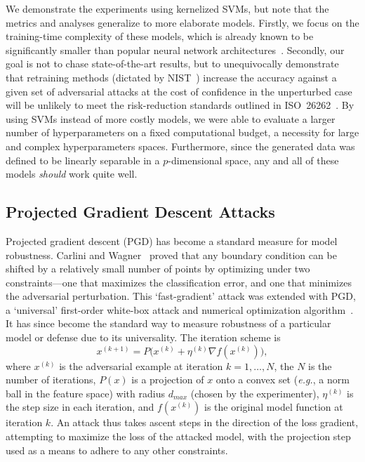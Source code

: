 \documentclass[fonts]{icst}
\begin{document}
We demonstrate the experiments using kernelized SVMs, but note that the metrics and analyses generalize to more elaborate models.
Firstly, we focus on the training-time complexity of these models, which is already known to be significantly smaller than popular neural network architectures~\cite{bienstock2018principled}.
Secondly, our goal is not to chase state-of-the-art results, but to unequivocally demonstrate that retraining methods (dictated by NIST~\cite{falco2006using}) increase the accuracy against a given set of adversarial attacks at the cost of confidence in the unperturbed case will be unlikely to meet the risk-reduction standards outlined in ISO~26262~\cite{iso26262}.
By using SVMs instead of more costly models, we were able to evaluate a larger number of hyperparameters on a fixed computational budget, a necessity for large and complex hyperparameters spaces.
Furthermore, since the generated data was defined to be linearly separable in a $p$-dimensional space, any and all of these models \textit{should} work quite well.

\subsection{Projected Gradient Descent Attacks}

Projected gradient descent (PGD) has become a standard measure for model robustness.
Carlini and Wagner~\cite{carlini2017towards} proved that any boundary condition can be shifted by a relatively small number of points by optimizing under two constraints---one that maximizes the classification error, and one that minimizes the adversarial perturbation.
This `fast-gradient' attack was extended with PGD, a `universal' first-order white-box attack and numerical optimization algorithm~\cite{madry2017towards}.
It has since become the standard way to measure robustness of a particular model or defense due to its universality.
The iteration scheme is
$$
    x^{(k+1)} = P\big(x^{(k)} + \eta^{(k)} \nabla f(x^{(k)})\big),
$$
where $x^{(k)}$ is the adversarial example at iteration $k = 1,\ldots,N$, the $N$ is the number of iterations, $P(x)$ is a projection of $x$ onto a convex set (\textit{e.g.}, a norm ball in the feature space) with radius $d_{max}$ (chosen by the experimenter), $\eta^{(k)}$ is the step size in each iteration, and $f(x^{(k)})$ is the original model function at iteration $k$.
An attack thus takes ascent steps in the direction of the loss gradient, attempting to maximize the loss of the attacked model, with the projection step used as a means to adhere to any other constraints.
\end{document}
